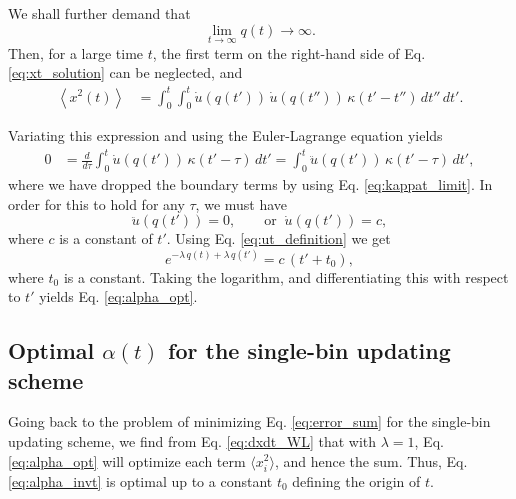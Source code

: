 \documentclass[reprint]{revtex4-1}
\begin{document}
We shall further demand that
%
\begin{equation}
  \lim_{t \to \infty} q(t) \to \infty.
  \label{eq:qt_limit}
\end{equation}
%
Then, for a large time $t$,
the first term on the right-hand side
of Eq. \eqref{eq:xt_solution} can be neglected, and
%
\begin{align}
\left\langle x^2(t) \right\rangle
&=
\int_0^t \int_0^t
  \dot u(q(t')) \, \dot u(q(t'')) \,
  \kappa(t' - t'') \, dt'' \, dt'.
\label{eq:x2t_average}
\end{align}



Variating this expression and
using the Euler-Lagrange equation yields
$$
\begin{aligned}
0
&=
\frac{d}{d\tau} \int_0^t \dot u(q(t')) \, \kappa(t' - \tau) \, dt'
= \int_0^t \ddot u(q(t')) \, \kappa(t' - \tau) \, dt',
\end{aligned}
$$
where we have dropped the boundary terms
by using Eq. \eqref{eq:kappat_limit}.
%
%
In order for this to hold for any $\tau$,
we must have
%
\begin{equation}
\ddot u(q(t')) = 0,
\qquad
\mathrm{or}
\;\;
\dot u(q(t')) = c,
\label{eq:ddu_eq_0}
\end{equation}
%
where $c$ is a constant of $t'$.
%
Using Eq. \eqref{eq:ut_definition}
we get
$$
e^{-\lambda \, q(t) + \lambda \, q(t')}
=
c \, (t' + t_0),
$$
where $t_0$ is a constant.
%
Taking the logarithm, and differentiating this with respect to $t'$
yields Eq. \eqref{eq:alpha_opt}.



\subsection{Optimal $\alpha(t)$ for the single-bin updating scheme}



Going back to the problem of
minimizing Eq. \eqref{eq:error_sum}
for the single-bin updating scheme,
we find from Eq. \eqref{eq:dxdt_WL}
that with $\lambda = 1$,
Eq. \eqref{eq:alpha_opt}
will optimize each term $\langle x_i^2 \rangle$,
and hence the sum.
%
Thus, Eq. \eqref{eq:alpha_invt} is optimal
up to a constant $t_0$ defining the origin of $t$.
\end{document}
